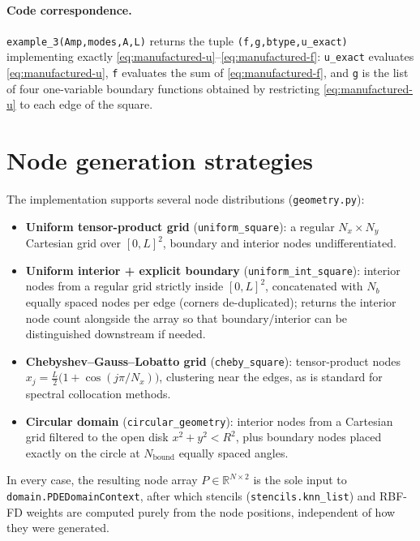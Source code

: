 \documentclass[11pt]{article}
\newcommand{\R}{\mathbb{R}}
\begin{document}
\paragraph{Code correspondence.}
\texttt{example\_3(Amp,modes,A,L)} returns the tuple
\texttt{(f,g,btype,u\_exact)} implementing exactly
\eqref{eq:manufactured-u}--\eqref{eq:manufactured-f}: \texttt{u\_exact}
evaluates \eqref{eq:manufactured-u}, \texttt{f} evaluates the sum of
\eqref{eq:manufactured-f}, and \texttt{g} is the list of four
one-variable boundary functions obtained by restricting
\eqref{eq:manufactured-u} to each edge of the square.

\section{Node generation strategies}

The implementation supports several node distributions
(\texttt{geometry.py}):
\begin{itemize}[leftmargin=2em]
  \item \textbf{Uniform tensor-product grid} (\texttt{uniform\_square}):
        a regular $N_x \times N_y$ Cartesian grid over $[0,L]^2$,
        boundary and interior nodes undifferentiated.
  \item \textbf{Uniform interior + explicit boundary}
        (\texttt{uniform\_int\_square}): interior nodes from a regular
        grid strictly inside $[0,L]^2$, concatenated with $N_b$
        equally spaced nodes per edge (corners de-duplicated); returns
        the interior node count alongside the array so that
        boundary/interior can be distinguished downstream if needed.
  \item \textbf{Chebyshev--Gauss--Lobatto grid} (\texttt{cheby\_square}):
        tensor-product nodes \\ $x_j = \tfrac{L}{2}\big(1+\cos(j\pi/N_x)\big)$,
        clustering near the edges, as is standard for spectral
        collocation methods.
  \item \textbf{Circular domain} (\texttt{circular\_geometry}):
        interior nodes from a Cartesian grid filtered to the open disk
        $x^2+y^2<R^2$, plus boundary nodes placed exactly on the circle
        at $N_{\text{bound}}$ equally spaced angles.
\end{itemize}
In every case, the resulting node array $P \in \R^{N\times 2}$ is the
sole input to \texttt{domain.PDEDomainContext}, after which stencils
(\texttt{stencils.knn\_list}) and RBF-FD weights are computed purely
from the node positions, independent of how they were generated.
\end{document}

